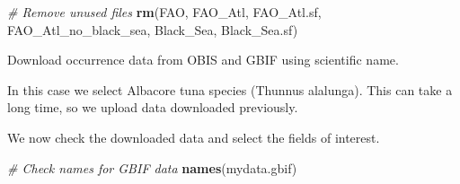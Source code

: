 \documentclass[
]{book}
\newenvironment{Shaded}{\begin{snugshade}}{\end{snugshade}}
\newcommand{\CommentTok}[1]{\textcolor[rgb]{0.56,0.35,0.01}{\textit{#1}}}
\newcommand{\FunctionTok}[1]{\textcolor[rgb]{0.13,0.29,0.53}{\textbf{#1}}}
\newcommand{\NormalTok}[1]{#1}
\newcommand{\SpecialCharTok}[1]{\textcolor[rgb]{0.81,0.36,0.00}{\textbf{#1}}}
\newcommand{\StringTok}[1]{\textcolor[rgb]{0.31,0.60,0.02}{#1}}
\begin{document}
\begin{Shaded}
\begin{Highlighting}[]
\CommentTok{\# Remove unused files}
\FunctionTok{rm}\NormalTok{(FAO, FAO\_Atl, FAO\_Atl.sf, FAO\_Atl\_no\_black\_sea,}
\NormalTok{    Black\_Sea, Black\_Sea.sf)}
\end{Highlighting}
\end{Shaded}

Download occurrence data from OBIS and GBIF using scientific name.

In this case we select Albacore tuna species (Thunnus alalunga). This can take a long time, so we upload data downloaded previously.

\begin{Shaded}
\end{Shaded}

We now check the downloaded data and select the fields of interest.

\begin{Shaded}
\begin{Highlighting}[]
\CommentTok{\# Check names for GBIF data}
\FunctionTok{names}\NormalTok{(mydata.gbif)}
\end{Highlighting}
\end{Shaded}
\end{document}
